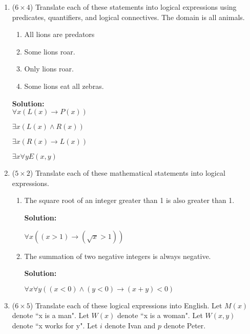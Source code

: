 \documentclass[12pt]{article}
\begin{document}
\begin{enumerate}


\item ($6 \times 4$)
Translate each of these statements into logical expressions using predicates, quantifiers, and logical connectives. The domain is all animals.

\begin{enumerate}
\item
All lions are predators


\item
Some lions roar.

\item
Only lions roar.

\item
Some lions eat all zebras.
\end{enumerate}

{\bf Solution:}\\
$\forall x (L(x) \to P(x))$

$\exists x (L(x) \land R(x))$

$\exists x (R(x) \to L(x))$

$\exists x \forall y E(x,y)$
\newpage




\item ($5 \times 2$)
Translate each of these mathematical statements into logical expressions.

\begin{enumerate}

\item
The square root of an integer greater than 1 is also greater than 1.

{\bf Solution:}

$\forall x ((x > 1) \to (\sqrt{x} > 1))$
\item
The summation of two negative integers is always negative.

{\bf Solution:}

$\forall x \forall y ((x < 0) \land (y < 0) \to (x + y) < 0)$
\newpage


\end{enumerate}

\item ($6 \times 5$)
Translate each of these logical expressions into English. Let $M(x)$ denote ``x is a man". Let $W(x)$ denote ``x is a woman". Let $W(x,y)$ denote ``x works for y". Let $i$ denote Ivan and $p$ denote Peter.
\begin{enumerate}


\end{enumerate}
\end{enumerate}
\end{document}
